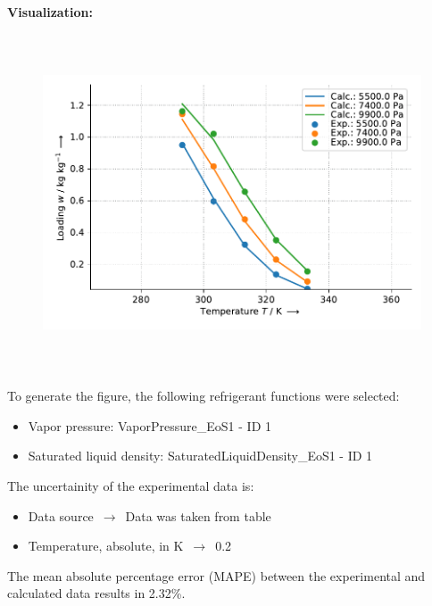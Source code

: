 \textbf{Visualization:}
%
\begin{figure}[!htp]
{\noindent\includegraphics[height=10cm, keepaspectratio]{figs/ads/ads_Methanol_activated_carbon_powder_Maxsorb_III_DubininAstakhov_1.pdf}}
\end{figure}
%

To generate the figure, the following refrigerant functions were selected:
\begin{itemize}
\item Vapor pressure: VaporPressure\_EoS1 - ID 1
\item Saturated liquid density: SaturatedLiquidDensity\_EoS1 - ID 1
\end{itemize}

The uncertainity of the experimental data is:
\begin{itemize}
\item Data source $\,\to\,$ Data was taken from table
\item Temperature, absolute, in $\si{\kelvin}$ $\,\to\,$ 0.2
\end{itemize}

The mean absolute percentage error (MAPE) between the experimental and calculated data results in 2.32\%.
\FloatBarrier
\newpage
